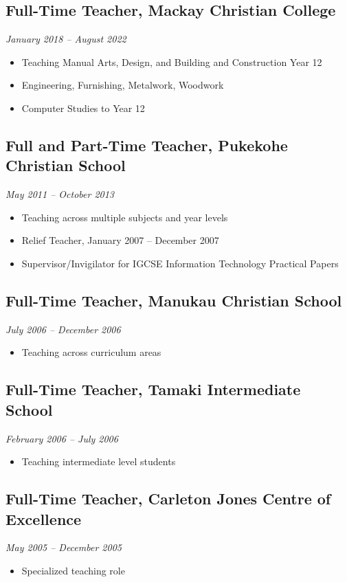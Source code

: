 \documentclass[11pt,a4paper]{article}
\begin{document}
\subsection*{Full-Time Teacher, Mackay Christian College}
\textit{January 2018 – August 2022}
\begin{itemize}
    \item Teaching Manual Arts, Design, and Building and Construction Year 12
    \item Engineering, Furnishing, Metalwork, Woodwork
    \item Computer Studies to Year 12
\end{itemize}

\subsection*{Full and Part-Time Teacher, Pukekohe Christian School}
\textit{May 2011 – October 2013}
\begin{itemize}
    \item Teaching across multiple subjects and year levels
    \item Relief Teacher, January 2007 – December 2007
    \item Supervisor/Invigilator for IGCSE Information Technology Practical Papers
\end{itemize}

\subsection*{Full-Time Teacher, Manukau Christian School}
\textit{July 2006 – December 2006}
\begin{itemize}
    \item Teaching across curriculum areas
\end{itemize}

\subsection*{Full-Time Teacher, Tamaki Intermediate School}
\textit{February 2006 – July 2006}
\begin{itemize}
    \item Teaching intermediate level students
\end{itemize}

\subsection*{Full-Time Teacher, Carleton Jones Centre of Excellence}
\textit{May 2005 – December 2005}
\begin{itemize}
    \item Specialized teaching role
\end{itemize}
\end{document}
